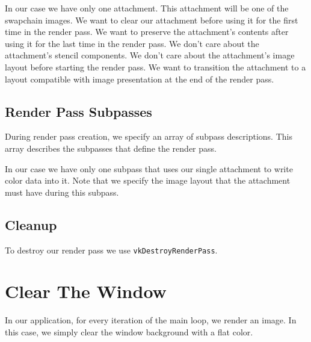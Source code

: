 In our case we have only one attachment.
This attachment will be one of the swapchain images.
We want to clear our attachment before using it for the first time in the
render pass.
We want to preserve the attachment's contents after using it for the last
time in the render pass.
We don't care about the attachment's stencil components.
We don't care about the attachment's image layout before starting the render pass.
We want to transition the attachment to a layout compatible with image presentation
at the end of the render pass.

\begin{minipage}{\linewidth}{\noindent}
    
\end{minipage}

\subsection{Render Pass Subpasses}

During render pass creation, we specify an array of subpass descriptions.
This array describes the subpasses that define the render pass.

In our case we have only one subpass that uses our single attachment to write
color data into it.
Note that we specify the image layout that the attachment must have during
this subpass.

\begin{minipage}{\linewidth}{\noindent}
    
\end{minipage}

\subsection{Cleanup}

To destroy our render pass we use \texttt{vkDestroyRenderPass}.

\section{Clear The Window}

In our application, for every iteration of the main loop, we render an image.
In this case, we simply clear the window background with a flat color.

